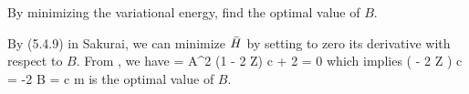\begin{problem}
	By minimizing the variational energy, find the optimal value of $B$.
\end{problem}

\begin{solution}
	By (5.4.9) in Sakurai, we can minimize $\bar{H}$ by setting to zero its derivative with respect to $B$.  From , we have
	\beq
		 = A^2 (1 - 2 Z) \alp \hbar c + 2  = 0
	\eeq
	which implies
	\beq
		\left(  - 2 Z \right) \alp c = -2 
		\implies
		B =  \alp c m
	\eeq
	is the optimal value of $B$.
\end{solution}